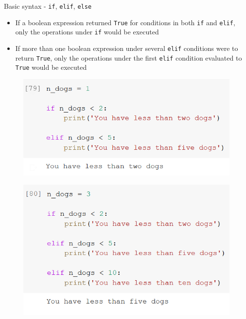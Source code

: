\documentclass[aspectratio=169]{beamer}
\begin{document}
\begin{frame}{Basic syntax - \texttt{if}, \texttt{elif}, \texttt{else}}

	\begin{itemize}
		\item If a boolean expression returned \texttt{True} for conditions in both \texttt{if} and \texttt{elif}, only the operations  under \texttt{if} would be executed
		\item If more than one boolean expression under several \texttt{elif} conditions were to return \texttt{True}, only the operations under the first \texttt{elif} condition evaluated to \texttt{True} would be executed
	\end{itemize}

	\begin{multicols}{2}

		\begin{figure}
			\centering
			\includegraphics[width=\linewidth]{img/if_and_elif_true.png}
		\end{figure}
		\begin{figure}
			\centering
			\includegraphics[width=\linewidth]{img/elif_and_elif_true.png}
		\end{figure}

	\end{multicols}

\end{frame}
\end{document}
